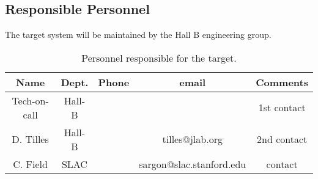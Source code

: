 \subsection{Responsible Personnel}

\indent

The target system will be maintained by the Hall B engineering group.  

 \begin{table}[!htb]
 \centering
 \begin{tabular}{|c|c|c|c|c|}
\hline
 Name&Dept.&Phone&email&Comments \\ \hline
 Tech-on-call & Hall-B&&& 1st contact  \\ \hline
 D. Tilles & Hall-B&&tilles@jlab.org&2nd contact \\ \hline
C. Field& SLAC&&sargon@slac.stanford.edu&contact \\ \hline
 \end{tabular}
\caption{ Personnel responsible for the target.} 
\label{tb:beam}
\end{table}


